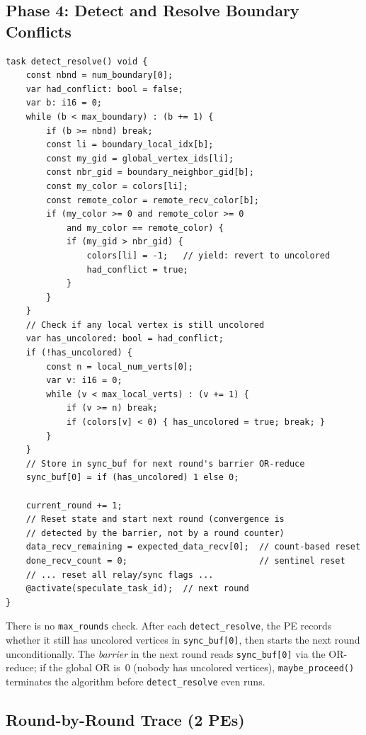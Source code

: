\documentclass[11pt,letterpaper]{article}
\begin{document}
\subsection{Phase 4: Detect and Resolve Boundary Conflicts}

\begin{lstlisting}[language=CSL, caption={Detect/resolve with convergence tracking (from \texttt{pe\_program.csl})}, label=lst:detect]
task detect_resolve() void {
    const nbnd = num_boundary[0];
    var had_conflict: bool = false;
    var b: i16 = 0;
    while (b < max_boundary) : (b += 1) {
        if (b >= nbnd) break;
        const li = boundary_local_idx[b];
        const my_gid = global_vertex_ids[li];
        const nbr_gid = boundary_neighbor_gid[b];
        const my_color = colors[li];
        const remote_color = remote_recv_color[b];
        if (my_color >= 0 and remote_color >= 0
            and my_color == remote_color) {
            if (my_gid > nbr_gid) {
                colors[li] = -1;   // yield: revert to uncolored
                had_conflict = true;
            }
        }
    }
    // Check if any local vertex is still uncolored
    var has_uncolored: bool = had_conflict;
    if (!has_uncolored) {
        const n = local_num_verts[0];
        var v: i16 = 0;
        while (v < max_local_verts) : (v += 1) {
            if (v >= n) break;
            if (colors[v] < 0) { has_uncolored = true; break; }
        }
    }
    // Store in sync_buf for next round's barrier OR-reduce
    sync_buf[0] = if (has_uncolored) 1 else 0;

    current_round += 1;
    // Reset state and start next round (convergence is
    // detected by the barrier, not by a round counter)
    data_recv_remaining = expected_data_recv[0];  // count-based reset
    done_recv_count = 0;                          // sentinel reset
    // ... reset all relay/sync flags ...
    @activate(speculate_task_id);  // next round
}
\end{lstlisting}

There is no \texttt{max\_rounds} check. After each \texttt{detect\_resolve}, the PE records whether it still has uncolored vertices in \texttt{sync\_buf[0]}, then starts the next round unconditionally. The \emph{barrier} in the next round reads \texttt{sync\_buf[0]} via the OR-reduce; if the global OR is~0 (nobody has uncolored vertices), \texttt{maybe\_proceed()} terminates the algorithm before \texttt{detect\_resolve} even runs.

\subsection{Round-by-Round Trace (2 PEs)}
\end{document}
